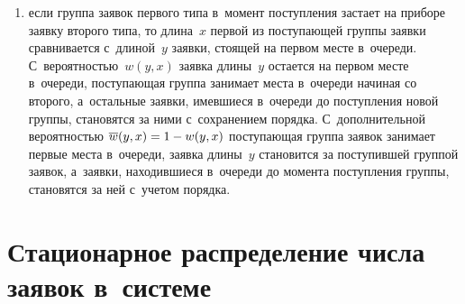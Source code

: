 \begin{multicols}{2}
\begin{enumerate}[(1)]
\item
если группа заявок первого типа в~момент поступления застает на 
приборе заявку второго типа, то длина~$x$ первой из поступающей группы 
заявки сравнивается с~длиной~$y$ заявки, стоящей на первом месте в~очереди. 
С~вероятностью~$w(y,x)$ заявка длины~$y$ остается на первом месте в~очереди, 
поступающая группа занимает места в~очереди начиная со второго, а~остальные 
заявки, имевшиеся в~очереди до поступления новой группы, становятся за 
ними с~сохранением порядка. С~дополнительной вероятностью 
$\overline{w}(y,x)\hm=1\hm-w(y,x)$ поступа\-ющая группа заявок 
занимает первые места в~очереди, заявка длины~$y$ 
становится за поступившей группой заявок, а~заявки, находившиеся в~очереди 
до момента поступления группы, становятся за ней с~учетом порядка.
\end{enumerate}

\vspace*{-6pt}

\section{Стационарное распределение числа заявок в~системе}


\end{multicols}
